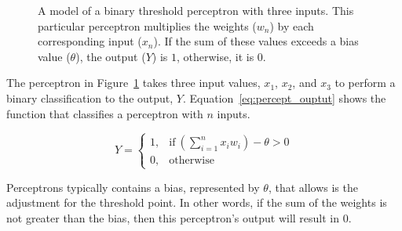 \begin{figure}[ht]
\centering
{}
\caption[Diagram of Three Input Perceptron]{A model of a binary threshold perceptron with three inputs. This particular perceptron multiplies the weights ($w_n$) by each corresponding input ($x_n$). If the sum of these values exceeds a bias value ($\theta$), the output ($Y$) is $1$, otherwise, it is $0$.}
\label{fig:preceptron_example}
\end{figure}

The perceptron in Figure~\ref{fig:preceptron_example} takes three input values, $x_1$, $x_2$, and $x_3$ to perform a binary classification to the output, $Y$. Equation~\ref{eq:percept_ouptut} shows the function that classifies a perceptron with $n$ inputs.

\begin{equation} \label{eq:percept_ouptut}
Y = 
    \begin{cases}
        1, & \text{if}\ (\sum\limits_{i=1}^n  x_i  w_i) - \theta > 0\\
        0, & \text{otherwise}
    \end{cases}
\end{equation}

Perceptrons typically contains a bias, represented by $\theta$, that allows is the adjustment for the threshold point. In other words, if the sum of the weights is not greater than the bias, then this perceptron's output will result in 0. 

